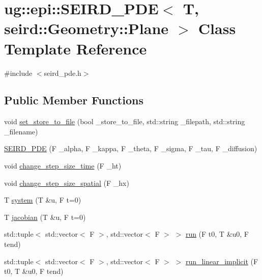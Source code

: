 \hypertarget{classug_1_1epi_1_1_s_e_i_r_d___p_d_e_3_01_t_00_01seird_1_1_geometry_1_1_plane_01_4}{}\section{ug\+:\+:epi\+:\+:S\+E\+I\+R\+D\+\_\+\+P\+DE$<$ T, seird\+:\+:Geometry\+:\+:Plane $>$ Class Template Reference}
\label{classug_1_1epi_1_1_s_e_i_r_d___p_d_e_3_01_t_00_01seird_1_1_geometry_1_1_plane_01_4}


{\ttfamily \#include $<$seird\+\_\+pde.\+h$>$}

\subsection*{Public Member Functions}
\begin{DoxyCompactItemize}
\item 
void \hyperlink{classug_1_1epi_1_1_s_e_i_r_d___p_d_e_3_01_t_00_01seird_1_1_geometry_1_1_plane_01_4_aa399c391e02e88e7ad5524552810ba13}{set\+\_\+store\+\_\+to\+\_\+file} (bool \+\_\+store\+\_\+to\+\_\+file, std\+::string \+\_\+filepath, std\+::string \+\_\+filename)
\item 
\hyperlink{classug_1_1epi_1_1_s_e_i_r_d___p_d_e_3_01_t_00_01seird_1_1_geometry_1_1_plane_01_4_acee8173ad6d681ca2333dcccb7e60512}{S\+E\+I\+R\+D\+\_\+\+P\+DE} (F \+\_\+alpha, F \+\_\+kappa, F \+\_\+theta, F \+\_\+sigma, F \+\_\+tau, F \+\_\+diffusion)
\item 
void \hyperlink{classug_1_1epi_1_1_s_e_i_r_d___p_d_e_3_01_t_00_01seird_1_1_geometry_1_1_plane_01_4_a61447688b8d2efc8f873655d4ac608d5}{change\+\_\+step\+\_\+size\+\_\+time} (F \+\_\+ht)
\item 
void \hyperlink{classug_1_1epi_1_1_s_e_i_r_d___p_d_e_3_01_t_00_01seird_1_1_geometry_1_1_plane_01_4_ac05da5b9ad1c004a4f727f92f8e9a6bd}{change\+\_\+step\+\_\+size\+\_\+spatial} (F \+\_\+hx)
\item 
T \hyperlink{classug_1_1epi_1_1_s_e_i_r_d___p_d_e_3_01_t_00_01seird_1_1_geometry_1_1_plane_01_4_a674b90eb5d894a5552591332f5ec7400}{system} (T \&u, F t=0)
\item 
T \hyperlink{classug_1_1epi_1_1_s_e_i_r_d___p_d_e_3_01_t_00_01seird_1_1_geometry_1_1_plane_01_4_ab3d8ae9995810401b7f0e0424aab0522}{jacobian} (T \&u, F t=0)
\item 
std\+::tuple$<$ std\+::vector$<$ F $>$, std\+::vector$<$ F $>$ $>$ \hyperlink{classug_1_1epi_1_1_s_e_i_r_d___p_d_e_3_01_t_00_01seird_1_1_geometry_1_1_plane_01_4_ab79b175504e0ed645711bf3ef8edcac5}{run} (F t0, T \&u0, F tend)
\item 
std\+::tuple$<$ std\+::vector$<$ F $>$, std\+::vector$<$ F $>$ $>$ \hyperlink{classug_1_1epi_1_1_s_e_i_r_d___p_d_e_3_01_t_00_01seird_1_1_geometry_1_1_plane_01_4_a2ce486c85f7932c90cce4a11ecb7f05b}{run\+\_\+linear\+\_\+implicit} (F t0, T \&u0, F tend)
\end{DoxyCompactItemize}
